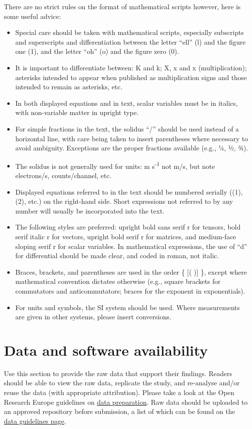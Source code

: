 \documentclass[10pt,a4paper]{article}
\begin{document}
There are no strict rules on the format of mathematical scripts however, here is some useful advice:
\begin{itemize}
\item Special care should be taken with mathematical scripts, especially subscripts and superscripts and differentiation between the letter “ell” (l) and the figure one (1), and the letter “oh” (o) and the figure zero (0).
\item It is important to differentiate between: K and k; X, x and x (multiplication); asterisks intended to appear when published as multiplication signs and those intended to remain as asterisks, etc.
\item In both displayed equations and in text, scalar variables must be in italics, with non-variable matter in upright type.
\item For simple fractions in the text, the solidus “/” should be used instead of a horizontal line, with care being taken to insert parentheses where necessary to avoid ambiguity. Exceptions are the proper fractions available (e.g., ¼, ½, ¾).
\item The solidus is not generally used for units: m s\textsuperscript{-1} not m/s, but note electrons/s, counts/channel, etc.
\item Displayed equations referred to in the text should be numbered serially ((1), (2), etc.) on the right-hand side. Short expressions not referred to by any number will usually be incorporated into the text.
\item The following styles are preferred: upright bold sans serif r for tensors, bold serif italic r for vectors, upright bold serif r for matrices, and medium-face sloping serif r for scalar variables. In mathematical expressions, the use of “d” for differential should be made clear, and coded in roman, not italic.
\item Braces, brackets, and parentheses are used in the order \{ [( )] \}, except where mathematical convention dictates otherwise (e.g., square brackets for commutators and anticommutators; braces for the exponent in exponentials).
\item For units and symbols, the SI system should be used. Where measurements are given in other systems, please insert conversions.
\end{itemize}

\section*{Data and software availability} %
Use this section to provide the raw data that support their findings. Readers should be able to view the raw data, replicate the study, and re-analyse and/or reuse the data (with appropriate attribution). Please take a look at the Open Research Europe guidelines on \href{https://open-research-europe.ec.europa.eu/for-authors/data-guidelines}{data preparation}.
Raw data should be uploaded to an approved repository before submission, a list of which can be found on the \href{https://open-research-europe.ec.europa.eu/for-authors/data-guidelines#hosting}{data guidelines page}.
\end{document}
